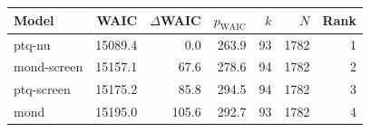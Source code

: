 \begin{tabular}{lrrrrrr}
\toprule
Model & WAIC & $\Delta$WAIC & $p_{\mathrm{WAIC}}$ & $k$ & $N$ & Rank \\
\midrule
ptq-nu & 15089.4 & 0.0 & 263.9 & 93 & 1782 & 1 \\
mond-screen & 15157.1 & 67.6 & 278.6 & 94 & 1782 & 2 \\
ptq-screen & 15175.2 & 85.8 & 294.5 & 94 & 1782 & 3 \\
mond & 15195.0 & 105.6 & 292.7 & 93 & 1782 & 4 \\
\bottomrule
\end{tabular}
